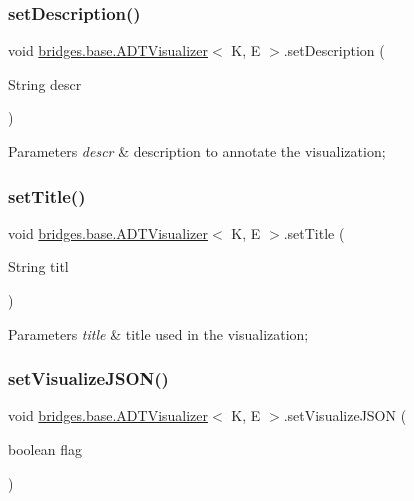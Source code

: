 \subsubsection{\texorpdfstring{set\+Description()}{setDescription()}}
{\footnotesize\ttfamily void \hyperlink{classbridges_1_1base_1_1_a_d_t_visualizer}{bridges.\+base.\+A\+D\+T\+Visualizer}$<$ K, E $>$.set\+Description (\begin{DoxyParamCaption}\item[{String}]{descr }\end{DoxyParamCaption})}


\begin{DoxyParams}{Parameters}
{\em descr} & description to annotate the visualization; \\
\hline
\end{DoxyParams}
\hypertarget{classbridges_1_1base_1_1_a_d_t_visualizer_ab0fda74356fefe16f5b3b98a5fce1f9e}{}\label{classbridges_1_1base_1_1_a_d_t_visualizer_ab0fda74356fefe16f5b3b98a5fce1f9e} 
\subsubsection{\texorpdfstring{set\+Title()}{setTitle()}}
{\footnotesize\ttfamily void \hyperlink{classbridges_1_1base_1_1_a_d_t_visualizer}{bridges.\+base.\+A\+D\+T\+Visualizer}$<$ K, E $>$.set\+Title (\begin{DoxyParamCaption}\item[{String}]{titl }\end{DoxyParamCaption})}


\begin{DoxyParams}{Parameters}
{\em title} & title used in the visualization; \\
\hline
\end{DoxyParams}
\hypertarget{classbridges_1_1base_1_1_a_d_t_visualizer_a784ce15d23e6c8ff0d6e77f2274e2980}{}\label{classbridges_1_1base_1_1_a_d_t_visualizer_a784ce15d23e6c8ff0d6e77f2274e2980} 
\subsubsection{\texorpdfstring{set\+Visualize\+J\+S\+O\+N()}{setVisualizeJSON()}}
{\footnotesize\ttfamily void \hyperlink{classbridges_1_1base_1_1_a_d_t_visualizer}{bridges.\+base.\+A\+D\+T\+Visualizer}$<$ K, E $>$.set\+Visualize\+J\+S\+ON (\begin{DoxyParamCaption}\item[{boolean}]{flag }\end{DoxyParamCaption})}


